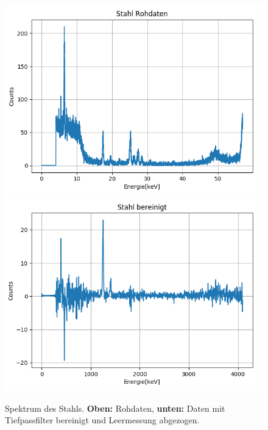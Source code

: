 \documentclass[12pt,a4paper]{article}
\begin{document}
\begin{figure}
\centering
\includegraphics[scale=0.8]{Bilder/alpha_spektren/stahl_roh.png}
\includegraphics[scale=0.8]{Bilder/alpha_spektren/stahl_cut.png}
\caption{Spektrum des Stahls. \textbf{Oben:} Rohdaten, \textbf{unten:} Daten mit Tiefpassfilter bereinigt und Leermessung abgezogen.}
\label{fig:a_prop_stahl}
\end{figure}
\end{document}
